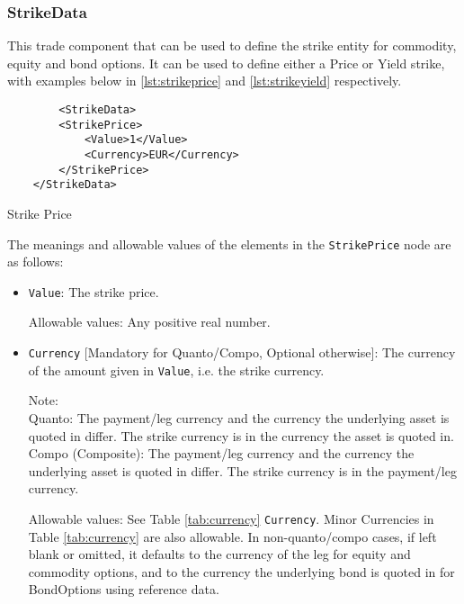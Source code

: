 \subsubsection{StrikeData}
\label{ss:strikedata}

This trade component that can be used to define the strike entity for commodity, equity and bond options. It can be used to define either a Price or Yield strike, with examples below in  \ref{lst:strikeprice} and \ref{lst:strikeyield} respectively.

\begin{listing}[H]
\begin{verbatim}
        <StrikeData>
		<StrikePrice>
			<Value>1</Value>
			<Currency>EUR</Currency>
		</StrikePrice>
	</StrikeData>
\end{verbatim}
\caption{Strike Price}
\label{lst:strikeprice}
\end{listing}

The meanings and allowable values of the elements in the \lstinline!StrikePrice! node are as follows:

\begin{itemize}

\item \lstinline!Value!: The strike price.

Allowable values: Any positive real number.

\item \lstinline!Currency! [Mandatory for Quanto/Compo, Optional otherwise]: The currency of the amount given in \lstinline!Value!, i.e. the strike currency.

	Note:\\
	Quanto: The payment/leg currency and the currency the underlying asset is quoted in differ. The strike currency is in the currency the asset is quoted in.\\
	Compo (Composite): The payment/leg currency and the currency the underlying asset is quoted in differ. The strike currency is in the payment/leg currency.

Allowable values: See Table \ref{tab:currency} \lstinline!Currency!. Minor Currencies in Table \ref{tab:currency} are also allowable. In non-quanto/compo cases, if left blank or omitted, it defaults to the currency of the leg for equity and commodity options, and to the currency the underlying bond is quoted in for BondOptions using reference data.

\end{itemize}

